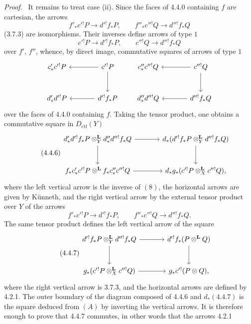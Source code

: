 \documentclass[11pt]{article}
\newenvironment{prooftext}[1][Proof]{\par\noindent\emph{#1.}\ }{\par\medskip}
\providecommand{\Dctf}{D_{\mathrm{ctf}}}
\providecommand{\Dctf}{D_{\mathrm{ctf}}}
\begin{document}
\begin{prooftext}[Proof]
It remains to treat case (ii). Since the faces of 4.4.0 containing $f$ are cartesian, the arrows
\[
f'_*c'{}^!P\longrightarrow d'{}^!f_*P,\qquad
f''_*c''{}^!Q\longrightarrow d''{}^!f_*Q
\]
(3.7.3) are isomorphisms. Their inverses define arrows of type $1$
\[
c'{}^!P\longrightarrow d'{}^!f_*P,\qquad
c''{}^!Q\longrightarrow d''{}^!f_*Q
\]
over $f'$, $f''$, whence, by direct image, commutative squares of arrows of type $1$
\[
\begin{tikzcd}[column sep=large,row sep=large]
c'_*c'{}^!P & c'{}^!P\arrow[l]\arrow[d]\\
d'_*d'{}^!P & d'{}^!f_*P\arrow[l]
\end{tikzcd}
\qquad
\begin{tikzcd}[column sep=large,row sep=large]
c''_*c''{}^!Q & c''{}^!Q\arrow[l]\arrow[d]\\
d''_*d''{}^!Q & d''{}^!f_*Q\arrow[l]
\end{tikzcd}
\]
over the faces of 4.4.0 containing $f$. Taking the tensor product, one obtains a commutative square in $\Dctf(Y)$
\begin{equation}
\tag{4.4.6}
\begin{tikzcd}[column sep=large,row sep=large]
d'_*d'{}^!f_*P\otimes_Y^{\mathbf L}d''_*d''{}^!f_*Q
 \arrow[r]\arrow[d] &
d_*(d'{}^!f_*P\otimes_Y^{\mathbf L}d''{}^!f_*Q)\arrow[d]\\
f_*c'_*c'{}^!P\otimes^{\mathbf L}f_*c''_*c''{}^!Q
 \arrow[r] &
d_*g_*(c'{}^!P\otimes_X^{\mathbf L}c''{}^!Q),
\end{tikzcd}
\end{equation}
where the left vertical arrow is the inverse of $(8)$, the horizontal arrows are given by Künneth, and the right vertical arrow by the external tensor product over $Y$ of the arrows
\[
f'_*c'{}^!P\longrightarrow d'{}^!f_*P,\qquad
f''_*c''{}^!Q\longrightarrow d''{}^!f_*Q.
\]
The same tensor product defines the left vertical arrow of the square
\begin{equation}
\tag{4.4.7}
\begin{tikzcd}[column sep=large,row sep=large]
d'{}^!f_*P\otimes_Y^{\mathbf L}d''{}^!f_*Q
 \arrow[r]\arrow[d] &
d'{}^!f_*(P\otimes^{\mathbf L}Q)\arrow[d]\\
g_*(c'{}^!P\otimes_X^{\mathbf L}c''{}^!Q)
 \arrow[r] &
g_*c'{}^!(P\otimes Q),
\end{tikzcd}
\end{equation}
where the right vertical arrow is 3.7.3, and the horizontal arrows are defined by 4.2.1. The outer boundary of the diagram composed of 4.4.6 and $d_*(4.4.7)$ is the square deduced from $(A)$ by inverting the vertical arrows. It is therefore enough to prove that 4.4.7 commutes, in other words that the arrows 4.2.1

\end{prooftext}
\end{document}
